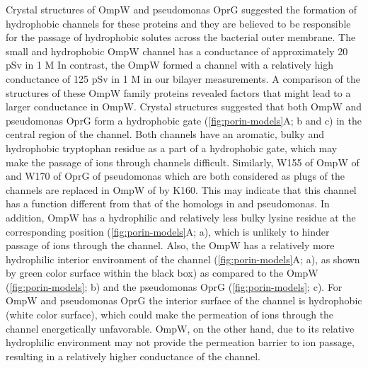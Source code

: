 Crystal structures of \ecoli OmpW and \ac{pseudomonas} OprG suggested the formation of hydrophobic channels for these proteins and they are believed to be responsible for the passage of hydrophobic solutes across the bacterial outer membrane. The small and hydrophobic \ecoli OmpW channel has a conductance of approximately 20 \si{\pico\sievert} in 1 M  In contrast, the \caulobacter OmpW formed a channel with a relatively high conductance of 125 \si{\pico\sievert} in 1 M  in our bilayer measurements. A comparison of the structures of these OmpW family proteins revealed factors that might lead to a larger conductance in \caulobacter OmpW. Crystal structures suggested that both \ecoli OmpW and \ac{pseudomonas} OprG form a hydrophobic gate (\cref{fig:porin-models}A; b and c) in the central region of the channel. Both channels have an aromatic, bulky and hydrophobic tryptophan residue as a part of a hydrophobic gate, which may make the passage of ions through channels difficult. Similarly, W155 of OmpW of \ecoli{} and W170 of OprG of \ac{pseudomonas} which are both considered as plugs of the channels are replaced in OmpW of \caulobacter by K160. This may indicate that this channel has a function different from that of the homologs in \ecoli and \ac{pseudomonas}. In addition, \caulobacter OmpW has a hydrophilic and relatively less bulky lysine residue at the corresponding position (\cref{fig:porin-models}A; a), which is unlikely to hinder passage of ions through the channel. Also, the \caulobacter OmpW has a relatively more hydrophilic interior environment of the channel (\cref{fig:porin-models}A; a), as shown by green color surface within the black box) as compared to the \ecoli OmpW (\cref{fig:porin-models}; b) and the  \ac{pseudomonas} OprG (\cref{fig:porin-models}; c). For \ecoli OmpW and \ac{pseudomonas} OprG the interior surface of the channel is hydrophobic (white color surface), which could make the permeation of ions through the channel energetically unfavorable. \caulobacter OmpW, on the other hand, due to its relative hydrophilic environment may not provide the permeation barrier to ion passage, resulting in a relatively higher conductance of the channel. 

